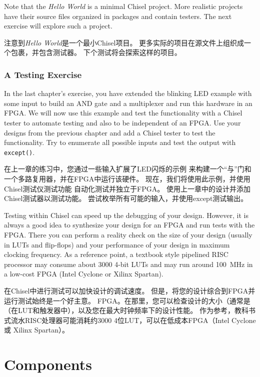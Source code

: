 \documentclass[%
    10pt,
    headinclude, footexclude,
    openright, %
    notitlepage,
    cleardoubleempty,
    headsepline,
    pointlessnumbers,
    bibtotoc, idxtotoc,
    ]{scrbook}
\newcommand{\code}[1]{{\small{\texttt{#1}}}}
\begin{document}
Note that the \emph{Hello World} is a minimal Chisel project.
More realistic projects have their source files organized in packages and contain testers.
The next exercise will explore such a project.

注意到\emph{Hello World}是一个最小Chisel项目。
更多实际的项目在源文件上组织成一个包裹，并包含测试器。
下个测试将会探索这样的项目。

\subsection{A Testing Exercise}

In the last chapter's exercise, you have extended the blinking LED example with some input
to build an AND gate and a multiplexer and run this hardware in an FPGA.
We will now use this example and test the functionality with a Chisel tester
to automate testing and also to be independent of an FPGA.
Use your designs from the previous chapter and add a Chisel tester to test the functionality.
Try to enumerate all possible inputs and test the output with \code{except()}.

在上一章的练习中，您通过一些输入扩展了LED闪烁的示例
来构建一个“与”门和一个多路复用器，并在FPGA中运行该硬件。
现在，我们将使用此示例，并使用Chisel测试仪测试功能
自动化测试并独立于FPGA。
使用上一章中的设计并添加Chisel测试器以测试功能。
尝试枚举所有可能的输入，并使用except测试输出。

Testing within Chisel can speed up the debugging of your design.
However, it is always a good idea to synthesize your design for an FPGA and run tests
with the FPGA. There you can perform a reality check on the size of your design (usually
in LUTs and flip-flops) and your performance of your design in maximum clocking frequency.
As a reference point, a textbook style pipelined RISC processor may consume about 3000
4-bit LUTs and may run around 100~MHz in a low-cost FPGA (Intel Cyclone or
Xilinx Spartan).


在Chisel中进行测试可以加快设计的调试速度。
但是，将您的设计综合到FPGA并运行测试始终是一个好主意。
FPGA。在那里，您可以检查设计的大小（通常是
（在LUT和触发器中），以及您在最大时钟频率下的设计性能。
作为参考，教科书式流水RISC处理器可能消耗约3000
4位LUT，可以在低成本FPGA（Intel Cyclone或
Xilinx Spartan）。


\chapter{Components}
\end{document}
